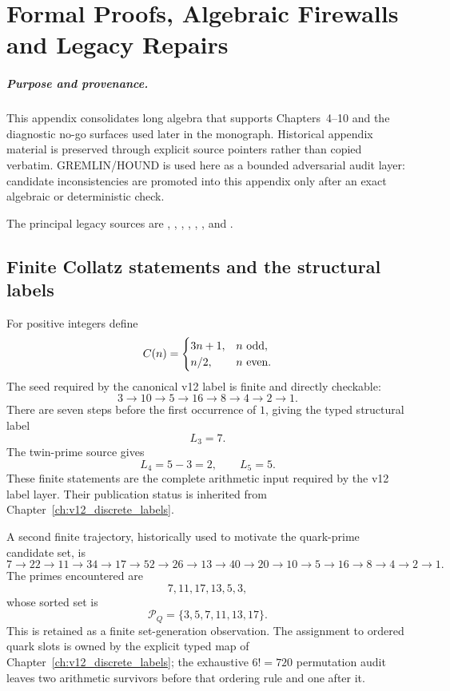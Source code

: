 \chapter{Formal Proofs, Algebraic Firewalls and Legacy Repairs}
\label{app:v12_formal_proofs}

\paragraph{Purpose and provenance.}
This appendix consolidates long algebra that supports Chapters~4--10 and the
diagnostic no-go surfaces used later in the monograph.  Historical appendix
material is preserved through explicit source pointers rather than copied
verbatim.  GREMLIN/HOUND is used here as a bounded adversarial audit layer:
candidate inconsistencies are promoted into this appendix only after an exact
algebraic or deterministic check.

The principal legacy sources are
,
,
,
,
,
, and
.

\section{Finite Collatz statements and the structural labels}

For positive integers define
\[
C(n)=
\begin{cases}
3n+1,&n\ \hbox{odd},\\
n/2,&n\ \hbox{even}.
\end{cases}
\]
The seed required by the canonical v12 label is finite and directly checkable:
\[
3\to10\to5\to16\to8\to4\to2\to1.
\]
There are seven steps before the first occurrence of \(1\), giving the typed
structural label
\[
\boxed{L_3=7.}
\]
The twin-prime source gives
\[
\boxed{L_4=5-3=2,\qquad L_5=5.}
\]
These finite statements are the complete arithmetic input required by the
v12 label layer.  Their publication status is inherited from
Chapter~\ref{ch:v12_discrete_labels}.

A second finite trajectory, historically used to motivate the quark-prime
candidate set, is
\[
7\to22\to11\to34\to17\to52\to26\to13\to40\to20\to10\to5
\to16\to8\to4\to2\to1.
\]
The primes encountered are
\[
7,11,17,13,5,3,
\]
whose sorted set is
\[
\mathcal P_Q=\{3,5,7,11,13,17\}.
\]
This is retained as a finite set-generation observation.  The assignment to
ordered quark slots is owned by the explicit typed map of
Chapter~\ref{ch:v12_discrete_labels}; the exhaustive \(6!=720\) permutation
audit leaves two arithmetic survivors before that ordering rule and one after
it.

